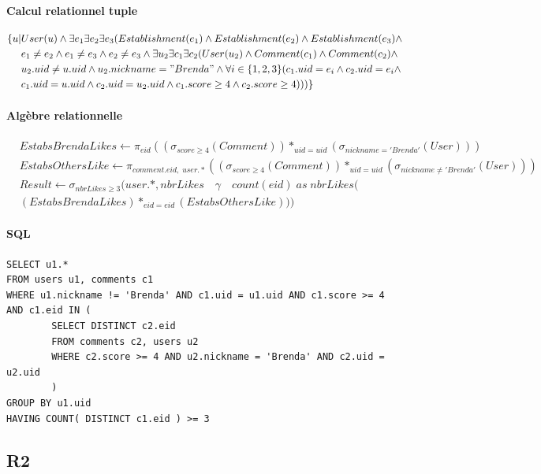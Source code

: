 \documentclass[11pt,a4paper]{report}
\begin{document}
\paragraph*{Calcul relationnel tuple}
\begin{align*}
\{ u | & User(u) \wedge \exists e_{1} \exists e_{2} \exists e_{3} ( Establishment(e_{1}) \wedge
Establishment(e_{2}) \wedge Establishment(e_{3}) \wedge \\ 
& e_{1} \neq e_{2} \wedge e_{1} \neq e_{3} \wedge e_{2} \neq e_{3} \wedge \exists u_{2} \exists c_{1} \exists c_{2} ( User(u_{2}) \wedge Comment(c_{1}) \wedge Comment(c_{2}) \wedge \\
& u_{2}.uid \neq u.uid \wedge u_{2}.nickname = "Brenda" \wedge \forall i \in \{1,2,3 \}(c_{1}.uid=e_{i} \wedge c_{2}.uid=e_{i} \wedge  \\
& c_{1}.uid = u.uid \wedge c_{2}.uid = u_{2}.uid \wedge  c_{1}.score \geq 4 \wedge  c_{2}.score \geq 4  )))
\}
\end{align*}
\paragraph*{Algèbre relationnelle}
\begin{align*}
& EstabsBrendaLikes \leftarrow \pi_{eid} ( ( \sigma_{score \ge 4} (Comment)) *_{uid=uid} (\sigma_{nickname = 'Brenda'} (User)) ) \\
& EstabsOthersLike \leftarrow \pi_{comment.eid, \; user.*} ( ( \sigma_{score \ge 4} (Comment)) *_{uid=uid} (\sigma_{nickname \neq 'Brenda'} (User)) )\\ 
& Result \leftarrow \sigma_{nbrLikes \ge 3} (user.*, nbrLikes \quad \gamma \quad count(eid) \; as\;  nbrLikes ( \\
& (EstabsBrendaLikes)*_{eid=eid}(EstabsOthersLike)) )
\end{align*}


\paragraph*{SQL}
\begin{verbatim}
SELECT u1.*
FROM users u1, comments c1
WHERE u1.nickname != 'Brenda' AND c1.uid = u1.uid AND c1.score >= 4 AND c1.eid IN (
        SELECT DISTINCT c2.eid
        FROM comments c2, users u2
        WHERE c2.score >= 4 AND u2.nickname = 'Brenda' AND c2.uid = u2.uid
        )
GROUP BY u1.uid
HAVING COUNT( DISTINCT c1.eid ) >= 3
\end{verbatim}
\subsection*{R2}
\end{document}
